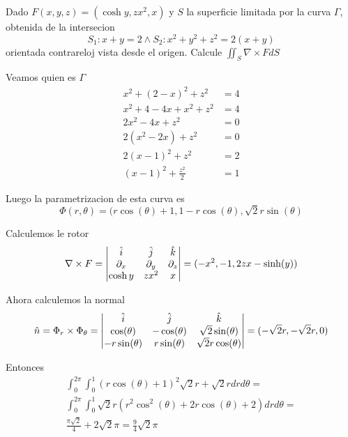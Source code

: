 \documentclass[../main.tex]{subfiles}
\begin{document}
\begin{problem}
  Dado $F(x, y, z) = (\cosh y, zx^{2}, x)$ y $S$ la superficie limitada por la curva $\Gamma$, obtenida de la intersecion
  \begin{equation*}
    S_{1}: x + y = 2 \land S_{2}: x^{2} + y^{2} + z^{2} = 2(x + y)
  \end{equation*}
  orientada contrareloj vista desde el origen. Calcule $\iint_{S} \nabla \times F dS$
\end{problem}
\begin{solution}
  Veamos quien es $\Gamma$
  \begin{align*}
    x^{2} + (2 - x)^{2} + z^{2} &= 4\\
    x^{2} + 4 - 4x + x^{2} + z^{2} &= 4\\
    2x^{2} - 4x + z^{2} &= 0\\
    2(x^{2} - 2x) + z^{2} &= 0\\
    2(x - 1)^{2} + z^{2} &= 2\\
    (x - 1)^{2} + \frac{z^{2}}{2} &= 1
  \end{align*}

  Luego la parametrizacion de esta curva es
  \begin{equation*}
    \Phi(r, \theta) = (r \cos(\theta) + 1, 1 - r \cos(\theta), \sqrt{2}r \sin(\theta)
  \end{equation*}

  Calculemos le rotor
  \begin{equation*}
    \nabla \times F = \begin{vmatrix} \hat{i} & \hat{j} & \hat{k}\\ \partial_x & \partial_y & \partial_z\\ \cosh y & zx^{2} & x\end{vmatrix} = (-x^{2}, -1, 2zx - \sinh(y))
  \end{equation*}

  Ahora calculemos la normal
  \begin{equation*}
    \hat{n} = \Phi_{r} \times \Phi_{\theta} = \begin{vmatrix} \hat{i} & \hat{j} & \hat{k}\\ \cos(\theta) & -\cos(\theta) & \sqrt{2}\sin(\theta)\\ -r \sin(\theta) & r \sin(\theta) & \sqrt{2}r \cos(\theta)\end{vmatrix} = (-\sqrt{2} r, -\sqrt{2} r, 0)
  \end{equation*}

  Entonces
  \begin{gather*}
    \int_{0}^{2\pi}\int_{0}^{1} (r \cos(\theta) + 1)^{2}\sqrt{2}r + \sqrt{2}r dr d\theta =\\
    \int_{0}^{2\pi}\int_{0}^{1} \sqrt{2}r (r^{2} \cos^{2}(\theta) + 2r \cos(\theta) + 2) dr d \theta =\\
    \frac{\pi \sqrt{2}}{4} + 2\sqrt{2} \pi = \frac{9}{4} \sqrt{2} \pi
  \end{gather*}

\end{solution}
\end{document}
